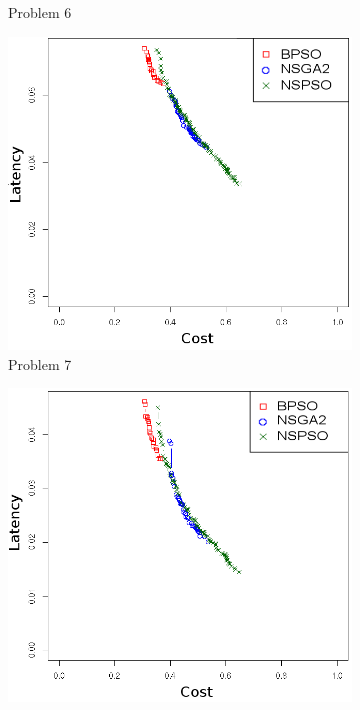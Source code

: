 \begin{figure}[t]
\begin{subfigure}{0.30\textwidth}
	   \caption{Problem 6}
   \end{subfigure}
   \begin{subfigure}{0.30\textwidth}
       \includegraphics[width=\textwidth]{pics/nsgabpso7.png}
	   \caption{Problem 7}
   \end{subfigure}
      \begin{subfigure}{0.30\textwidth}
       \includegraphics[width=\textwidth]{pics/nsgabpso8.png}

\end{subfigure}
\end{figure}
